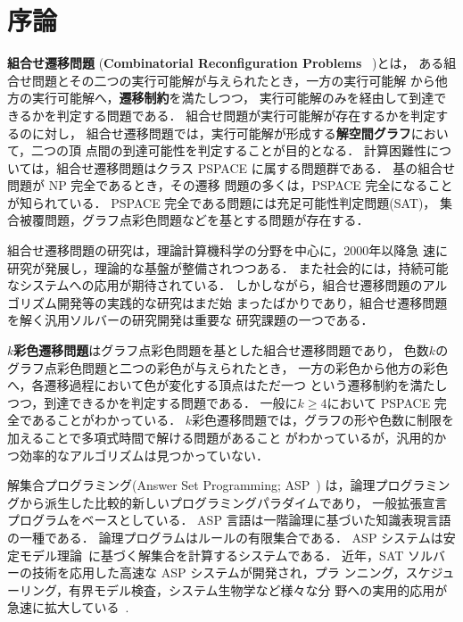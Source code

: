\chapter{序論} \label{chap:introduction}


\textbf{組合せ遷移問題} (\textbf{Combinatorial Reconfiguration Problems}
~\cite{Ito18:tohoku})とは，
ある組合せ問題とその二つの実行可能解が与えられたとき，一方の実行可能解
から他方の実行可能解へ，\textbf{遷移制約}を満たしつつ，
実行可能解のみを経由して到達できるかを判定する問題である．
組合せ問題が実行可能解が存在するかを判定するのに対し，
組合せ遷移問題では，実行可能解が形成する\textbf{解空間グラフ}において，二つの頂
点間の到達可能性を判定することが目的となる．
計算困難性については，組合せ遷移問題はクラス PSPACE に属する問題群である．
基の組合せ問題が NP 完全であるとき，その遷移
問題の多くは，PSPACE 完全になることが知られている．
PSPACE 完全である問題には充足可能性判定問題(SAT)，
集合被覆問題，グラフ点彩色問題などを基とする問題が存在する．

組合せ遷移問題の研究は，理論計算機科学の分野を中心に，2000年以降急
速に研究が発展し，理論的な基盤が整備されつつある．
また社会的には，持続可能なシステムへの応用が期待されている．
しかしながら，組合せ遷移問題のアルゴリズム開発等の実践的な研究はまだ始
まったばかりであり，組合せ遷移問題を解く汎用ソルバーの研究開発は重要な
研究課題の一つである．

\textbf{$k$彩色遷移問題}はグラフ点彩色問題を基とした組合せ遷移問題であり，
色数$k$のグラフ点彩色問題と二つの彩色が与えられたとき，
一方の彩色から他方の彩色へ，各遷移過程において色が変化する頂点はただ一つ
という遷移制約を満たしつつ，到達できるかを判定する問題である．
一般に$k \ge 4$において PSPACE 完全であることがわかっている．
$k$彩色遷移問題では，グラフの形や色数に制限を加えることで多項式時間で解ける問題があること
がわかっているが，汎用的かつ効率的なアルゴリズムは見つかっていない．

解集合プログラミング(Answer Set Programming; ASP~\cite{%
Baral03:cambridge,%
Gelfond88:iclp,%
Inoue08:jssst,%
Niemela99:amai})
は，論理プログラミングから派生した比較的新しいプログラミングパラダイムであり，
一般拡張宣言プログラムをベースとしている．
ASP 言語は一階論理に基づいた知識表現言語の一種である．
論理プログラムはルールの有限集合である．
ASP システムは安定モデル理論~\cite{Gelfond88:iclp}に基づく解集合を計算するシステムである．
近年，SAT ソルバーの技術を応用した高速な ASP システムが開発され，プラ
ンニング，スケジューリング，有界モデル検査，システム生物学など様々な分
野への実用的応用が急速に拡大している~\cite{Erdem16:AI}.

